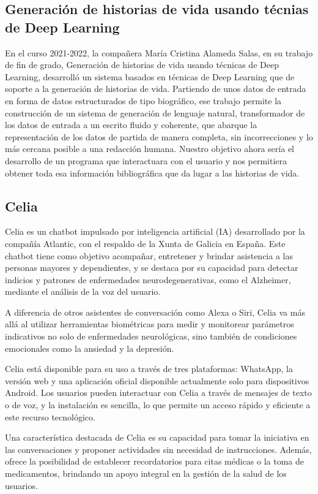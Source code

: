 \subsection{Generación de historias de vida usando técnias de Deep Learning}
En el curso 2021-2022, la compañera María Cristina Alameda Salas, en su trabajo de fin de grado, Generación de historias de vida
usando técnicas de Deep Learning, desarrolló un sistema basados en técnicas
de Deep Learning que de soporte a la generación de historias de vida. Partiendo de unos datos de entrada en forma de datos estructurados de tipo biográfico, ese trabajo permite la construcción de un sistema de generación de lenguaje natural, transformador de los datos de entrada a un escrito fluido y coherente, que abarque la representación de los datos de partida de manera completa, sin incorrecciones y lo más cercana posible a una redacción humana. Nuestro objetivo ahora sería el desarrollo de un programa que interactuara con el usuario y nos permitiera obtener toda esa información bibliográfica que da lugar a las historias de vida. 
\subsection{Celia}
Celia es un chatbot impulsado por inteligencia artificial (IA) desarrollado por la compañía Atlantic, con el respaldo de la Xunta de Galicia en España. Este chatbot tiene como objetivo acompañar, entretener y brindar asistencia a las personas mayores y dependientes, y se destaca por su capacidad para detectar indicios y patrones de enfermedades neurodegenerativas, como el Alzheimer, mediante el análisis de la voz del usuario.

A diferencia de otros asistentes de conversación como Alexa o Siri, Celia va más allá al utilizar herramientas biométricas para medir y monitorear parámetros indicativos no solo de enfermedades neurológicas, sino también de condiciones emocionales como la ansiedad y la depresión.

Celia está disponible para su uso a través de tres plataformas: WhatsApp, la versión web y una aplicación oficial disponible actualmente solo para dispositivos Android. Los usuarios pueden interactuar con Celia a través de mensajes de texto o de voz, y la instalación es sencilla, lo que permite un acceso rápido y eficiente a este recurso tecnológico.

Una característica destacada de Celia es su capacidad para tomar la iniciativa en las conversaciones y proponer actividades sin necesidad de instrucciones. Además, ofrece la posibilidad de establecer recordatorios para citas médicas o la toma de medicamentos, brindando un apoyo integral en la gestión de la salud de los usuarios.